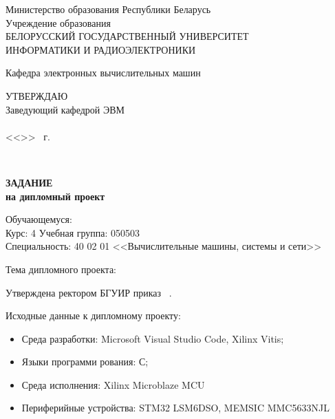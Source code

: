     \begin{center}
      Министерство образования Республики Беларусь\\[1em]
      Учреждение образования\\
      БЕЛОРУССКИЙ ГОСУДАРСТВЕННЫЙ УНИВЕРСИТЕТ \\
      ИНФОРМАТИКИ И РАДИОЭЛЕКТРОНИКИ\\[1em]
    \end{center}

    \begin{center}
      Кафедра электронных вычислительных машин
    \end{center}

    \begin{flushright}
      \begin{minipage}{0.4\textwidth}
        \MakeUppercase{Утверждаю}\\
        Заведующий кафедрой ЭВМ\\
        \underline{\hspace*{2.2cm}} \headOfDepartmentShort \\
        <<\underline{\hspace*{1cm}}>> \underline{\hspace*{2.5cm}} \targetYear\ г.
      \end{minipage}\\[1em]
    \end{flushright}

    \begin{center}
      \textbf{ЗАДАНИЕ}\\
      \textbf{на дипломный проект}\\[1em]
    \end{center}

    \noindent
    Обучающемуся: \studentFullTask \\
    Курс: 4 \hspace*{2ex} Учебная группа: 050503 \\
    Специальность: 40 02 01 <<Вычислительные машины, системы и сети>>

    \vspace{1em}
    \noindent
    Тема дипломного проекта: \taskNameFull

    \vspace{1em}
    \noindent
    Утверждена ректором БГУИР \uniDecreeDate приказ \textnumero \ \uniDecreeNumber.

    \vspace{1em}
    \noindent
    Исходные данные к дипломному проекту:
    \begin{itemize}[label={}, itemindent=\parindent]
      \item Среда разработки: Microsoft Visual Studio Code, Xilinx Vitis;
      \item Языки программи рования: С;
      \item Среда исполнения: Xilinx Microblaze MCU
      \item Периферийные устройства: STM32 LSM6DSO, MEMSIC MMC5633NJL
    \end{itemize}

